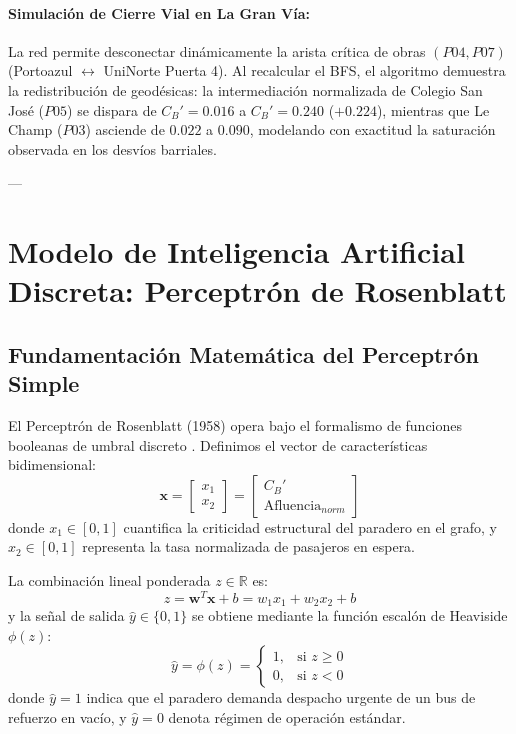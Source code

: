 \documentclass[11pt,letterpaper]{article}
\begin{document}
\paragraph{Simulación de Cierre Vial en La Gran Vía:}
La red permite desconectar dinámicamente la arista crítica de obras $(P04, P07)$ (Portoazul $\leftrightarrow$ UniNorte Puerta 4). Al recalcular el BFS, el algoritmo demuestra la redistribución de geodésicas: la intermediación normalizada de Colegio San José ($P05$) se dispara de $C_B' = 0.016$ a $C_B' = 0.240$ ($+0.224$), mientras que Le Champ ($P03$) asciende de $0.022$ a $0.090$, modelando con exactitud la saturación observada en los desvíos barriales.

---

\section{Modelo de Inteligencia Artificial Discreta: Perceptrón de Rosenblatt}

\subsection{Fundamentación Matemática del Perceptrón Simple}

El Perceptrón de Rosenblatt (1958) opera bajo el formalismo de funciones booleanas de umbral discreto \cite{rosenblatt1958,haykin2009}. Definimos el vector de características bidimensional:
\begin{equation}
\mathbf{x} = \begin{bmatrix} x_1 \\ x_2 \end{bmatrix} = \begin{bmatrix} C_B' \\ \text{Afluencia}_{norm} \end{bmatrix}
\end{equation}
donde $x_1 \in [0, 1]$ cuantifica la criticidad estructural del paradero en el grafo, y $x_2 \in [0, 1]$ representa la tasa normalizada de pasajeros en espera.

La combinación lineal ponderada $z \in \mathbb{R}$ es:
\begin{equation}
z = \mathbf{w}^T \mathbf{x} + b = w_1 x_1 + w_2 x_2 + b
\end{equation}
y la señal de salida $\hat{y} \in \{0, 1\}$ se obtiene mediante la función escalón de Heaviside $\phi(z)$:
\begin{equation}
\hat{y} = \phi(z) = \begin{cases} 1, & \text{si } z \ge 0 \\ 0, & \text{si } z < 0 \end{cases}
\end{equation}
donde $\hat{y} = 1$ indica que el paradero demanda despacho urgente de un bus de refuerzo en vacío, y $\hat{y} = 0$ denota régimen de operación estándar.
\end{document}
